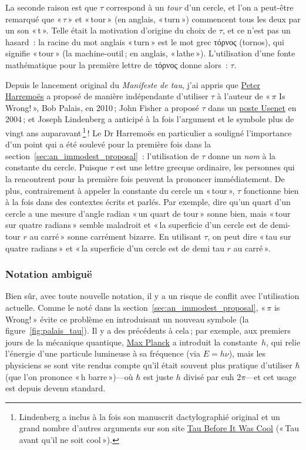 La seconde raison est que $\tau$ correspond à un \emph{tour} d'un cercle, et
l'on a peut-être remarqué que «\,$\tau$\,» et «\,tour\,» (en anglais,
«\,turn\,») commencent tous les deux par un son «\,t\,». Telle était la
motivation d'origine du choix de $\tau$, et ce n'est pas un hasard~: la racine
du mot anglais «\,turn\,» est le mot grec τόρνος (tornos), qui signifie
«\,tour\,» (la machine-outil\,; en anglais, «\,lathe\,»). L'utilisation d'une
fonte mathématique pour la première lettre de τόρνος donne alors~: $\tau$.

Depuis le lancement original du \emph{Manifeste de tau}, j'ai appris que
\href{http://www.harremoes.dk/Peter/Undervis/Turnpage/Turnpage1.pdf}{Peter
Harremoës} a proposé de manière indépendante d'utiliser $\tau$ à l'auteur de
«\,$\pi$ Is Wrong!\,», Bob Palais, en 2010\,; John Fisher a proposé $\tau$ dans
un
\href{https://groups.google.com/forum/#!msg/sci.math/c-DHmJHSA0A/sLCoOtHB1UAJ}{poste
Usenet} en 2004\,; et Joseph Lindenberg a anticipé à la fois l'argument et le
symbole plus de vingt ans auparavant\,\footnote{Lindenberg a inclus à la fois
son manuscrit dactylographié original et un grand nombre d'autres arguments sur
son site \href{https://sites.google.com/site/taubeforeitwascool/}{Tau Before It
Was Cool} («\,Tau avant qu'il ne soit cool\,»).}\,! Le Dr Harremoës en
particulier a souligné l'importance d'un point qui a été soulevé pour la
première fois dans la section~\ref{sec:an_immodest_proposal}~: l'utilisation de
$\tau$ donne un \emph{nom} à la constante du cercle. Puisque $\tau$ est une
lettre grecque ordinaire, les personnes qui la rencontrent pour la première fois
peuvent la prononcer immédiatement. De plus, contrairement à appeler la
constante du cercle un «\,tour\,», $\tau$ fonctionne bien à la fois dans des
contextes écrits et parlés. Par exemple, dire qu'un quart d'un cercle a une
mesure d'angle radian «\,un quart de tour\,» sonne bien, mais «\,tour sur quatre
radians\,» semble maladroit et «\,la superficie d'un cercle est de demi-tour $r$
au carré\,» sonne carrément bizarre. En utilisant $\tau$, on peut dire «\,tau
sur quatre radians\,» et «\,la superficie d'un cercle est de demi tau $r$ au
carré\,».

    \subsubsection{Notation ambiguë} %
    \label{sec:ambiguous_notation}


Bien sûr, avec toute nouvelle notation, il y a un risque de conflit avec
l'utilisation actuelle. Comme le noté dans la
section~\ref{sec:an_immodest_proposal}, «\,$\pi$ is Wrong!\,» évite ce problème
en introduisant un nouveau symbole (la figure~\ref{fig:palais_tau}). Il y a des
précédents à cela\,; par exemple, aux premiers jours de la mécanique quantique,
\href{https://fr.wikipedia.org/wiki/Max_Planck}{Max Planck} a introduit la
constante~$h$, qui relie l'énergie d'une particule lumineuse à sa fréquence (via
$E = h\nu$), mais les physiciens se sont vite rendus compte qu'il était souvent
plus pratique d'utiliser $\hbar$ (que l'on prononce «\,h barre\,»)---où $\hbar$
est juste $h$ divisé par\textellipsis{} euh\textellipsis{} $2\pi$---et cet usage
est depuis devenu standard.

